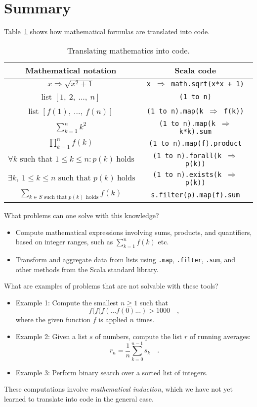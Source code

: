 \section{Summary}

Table~\ref{tab:translating-mathematics-into-code} shows how mathematical
formulas are translated into code.

\begin{table}
\begin{centering}
\begin{tabular}{|c|c|}
\hline 
\textbf{Mathematical notation} & \textbf{Scala code}\tabularnewline
\hline 
\hline 
$x\Rightarrow\sqrt{x^{2}+1}$ & \texttt{x $\Rightarrow$ math.sqrt(x{*}x + 1)}\tabularnewline
\hline 
list $\left[1,~2,~...,~n\right]$ & \texttt{(1 to n)}\tabularnewline
\hline 
list $\left[f(1),~...,~f(n)\right]$ & \texttt{(1 to n).map(k $\Rightarrow$ f(k))}\tabularnewline
\hline 
$\sum_{k=1}^{n}k^{2}$ & \texttt{(1 to n).map(k $\Rightarrow$ k{*}k).sum}\tabularnewline
\hline 
$\prod_{k=1}^{n}f(k)$ & \texttt{(1 to n).map(f).product}\tabularnewline
\hline 
$\forall k\text{ such that }1\leq k\leq n:p(k)~\text{holds}$ & \texttt{(1 to n).forall(k $\Rightarrow$ p(k))}\tabularnewline
\hline 
$\exists k,\:1\leq k\leq n\text{ such that }p(k)~\text{holds}$ & \texttt{(1 to n).exists(k $\Rightarrow$ p(k))}\tabularnewline
\hline 
${\displaystyle \sum_{k\in S\text{ such that }p(k)\text{ holds}}}f(k)$ & \texttt{s.filter(p).map(f).sum}\tabularnewline
\hline 
\end{tabular}
\par\end{centering}
\caption{Translating mathematics into code.\label{tab:translating-mathematics-into-code}}
\end{table}

What problems can one solve with this knowledge?
\begin{itemize}
\item Compute mathematical expressions involving sums, products, and quantifiers,
based on integer ranges, such as $\sum_{k=1}^{n}f(k)$ etc.
\item Transform and aggregate data from lists using \lstinline!.map!, \lstinline!.filter!,\textbf{
}\lstinline!.sum!, and other methods from the Scala standard library.
\end{itemize}
What are examples of problems that are not solvable with these tools?
\begin{itemize}
\item Example 1: Compute the smallest $n\geq1$ such that 
\[
f(f(f(...f(0)...)>1000\quad,
\]
where the given function $f$ is applied $n$ times.
\item Example 2: Given a list $s$ of numbers, compute the list $r$ of
running averages: 
\[
r_{n}=\frac{1}{n}\sum_{k=0}^{n-1}s_{k}\quad.
\]
\item Example 3: Perform binary search over a sorted list of integers.
\end{itemize}
These computations involve \emph{mathematical induction},
which we have not yet learned to translate into code in the general
case.

